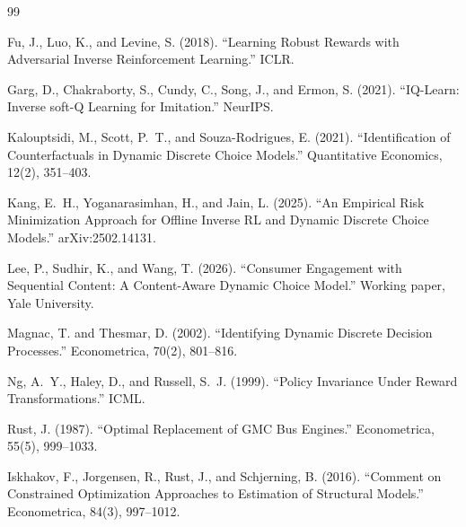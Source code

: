 \documentclass[11pt]{article}
\begin{document}
\begin{thebibliography}{99}

Fu, J., Luo, K., and Levine, S. (2018). ``Learning Robust Rewards with Adversarial Inverse Reinforcement Learning.'' ICLR.

Garg, D., Chakraborty, S., Cundy, C., Song, J., and Ermon, S. (2021). ``IQ-Learn: Inverse soft-Q Learning for Imitation.'' NeurIPS.

Kalouptsidi, M., Scott, P.~T., and Souza-Rodrigues, E. (2021). ``Identification of Counterfactuals in Dynamic Discrete Choice Models.'' Quantitative Economics, 12(2), 351--403.

Kang, E.~H., Yoganarasimhan, H., and Jain, L. (2025). ``An Empirical Risk Minimization Approach for Offline Inverse RL and Dynamic Discrete Choice Models.'' arXiv:2502.14131.

Lee, P., Sudhir, K., and Wang, T. (2026). ``Consumer Engagement with Sequential Content: A Content-Aware Dynamic Choice Model.'' Working paper, Yale University.

Magnac, T. and Thesmar, D. (2002). ``Identifying Dynamic Discrete Decision Processes.'' Econometrica, 70(2), 801--816.

Ng, A.~Y., Haley, D., and Russell, S.~J. (1999). ``Policy Invariance Under Reward Transformations.'' ICML.

Rust, J. (1987). ``Optimal Replacement of GMC Bus Engines.'' Econometrica, 55(5), 999--1033.

Iskhakov, F., Jorgensen, R., Rust, J., and Schjerning, B. (2016). ``Comment on Constrained Optimization Approaches to Estimation of Structural Models.'' Econometrica, 84(3), 997--1012.

\end{thebibliography}
\end{document}
